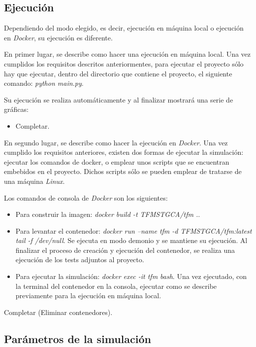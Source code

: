 \subsection{Ejecución}

Dependiendo del modo elegido, es decir, ejecución en máquina local o ejecución en \textit{Docker}, su ejecución es diferente.

En primer lugar, se describe como hacer una ejecución en máquina local. Una vez cumplidos los requisitos descritos anteriormentes,
para ejecutar el proyecto sólo hay que ejecutar, dentro del directorio que contiene el proyecto, el siguiente comando:
\textit{python main.py}.

Su ejecución se realiza automáticamente y al finalizar mostrará una serie de gráficas:

\begin{itemize}
  \item Completar.
\end{itemize}

En segundo lugar, se describe como hacer la ejecución en \textit{Docker}. Una vez cumplido los requisitos anteriores, existen dos
formas de ejecutar la simulación: ejecutar los comandos de docker, o emplear unos scripts que se encuentran embebidos en el proyecto.
Dichos scripts sólo se pueden emplear de tratarse de una máquina \textit{Linux}.

Los comandos de consola de \textit{Docker} son los siguientes:

\begin{itemize}
  \item Para construir la imagen: \textit{docker build -t TFMSTGCA/tfm .}.
  \item Para levantar el contenedor: \textit{docker run --name tfm -d TFMSTGCA/tfm:latest tail -f /dev/null}. Se ejecuta en modo demonio y se mantiene su
  ejecución. Al finalizar el proceso de creación y ejecución del contenedor, se realiza una ejecución de los tests adjuntos al proyecto.
  \item Para ejecutar la simulación: \textit{docker exec -it tfm bash}. Una vez ejecutado, con la terminal del contenedor en la consola, ejecutar como se describe previamente
  para la ejecución en máquina local.
\end{itemize}

Completar (Eliminar contenedores).

\subsection{Parámetros de la simulación}

